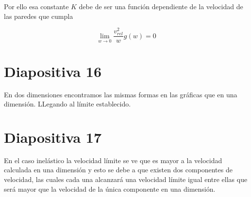 \documentclass[11pt, spanish]{article}
\begin{document}
Por ello esa constante \( K \) debe de ser una función dependiente de la velocidad de las paredes
que cumpla

\begin{equation}
    \lim_{w\rightarrow 0} \dfrac{v^2_{rel}}{w}g(w) = 0
\end{equation}

\section{Diapositiva 16}

En dos dimensiones encontramos las mismas formas en las gráficas que en una dimensión. LLegando al límite establecido. 

\section{Diapositiva 17}

En el caso inelástico la velocidad límite se ve que es mayor a la velocidad calculada en una dimensión y esto se debe a que existen dos componentes de velocidad, las cuales cada una alcanzará una velocidad límite igual entre ellas que será mayor que la velocidad de la única componente en una dimensión. 
\end{document}
